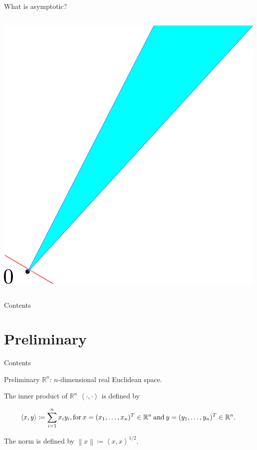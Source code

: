 \documentclass[aspectratio=169, dvipdfmx, 11pt]{beamer} %
\newcommand{\NDemenstionalRealEuclideanSpace}{\mathbb{R}^n}
\begin{document}
\begin{frame}{What is asymptotic?}
\begin{columns}
\begin{column}{0.48\textwidth}
            \includegraphics[keepaspectratio, scale=0.095]{figures/asymptotic_meaning_2.eps}
        \end{column}
    \end{columns}
\end{frame}

\begin{frame}{Contents}
    \tableofcontents
\end{frame}

\section{Preliminary}
\begin{frame}{Contents}
    \tableofcontents[currentsection]
\end{frame}

\begin{frame}{Preliminary}
$\NDemenstionalRealEuclideanSpace$: $n$-dimensional real Euclidean space.

The inner product of $\NDemenstionalRealEuclideanSpace$ $\left\langle \cdot ,\cdot \right\rangle$  is defined by

\begin{equation}
    \left\langle x,y\right\rangle \coloneqq \sum_{i = 1}^{n} x_i y_i, \text{for}\: x=(x_1,\dots,x_n)^T \in \mathbb{R}^n \:\text{and}\: y=(y_1,\dots,y_n)^T \in \mathbb{R}^n. \notag
\end{equation}

The norm is defined by $\left\lVert x \right\rVert \coloneqq \left\langle x,x\right\rangle ^{1/2} $.

\end{frame}
\end{document}
